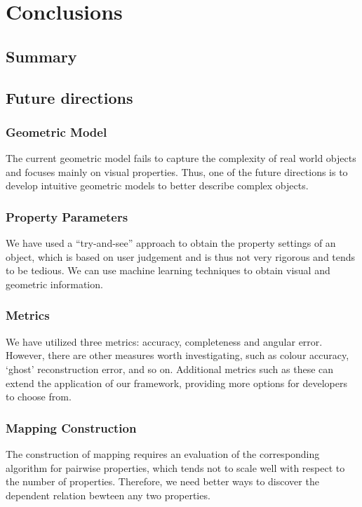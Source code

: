 
\chapter{Conclusions}
\label{sec:conclusion}

\section{Summary}

\section{Future directions}

\subsection{Geometric Model}
The current geometric model fails to capture the complexity of real world objects and focuses mainly on visual properties. Thus, one of the future directions is to develop intuitive geometric models to better describe complex objects.

\subsection{Property Parameters}
We have used a ``try-and-see'' approach to obtain the property settings of an object, which is based on user judgement and is thus not very rigorous and tends to be tedious. We can use machine learning techniques to obtain visual and geometric information.

\subsection{Metrics}
We have utilized three metrics: accuracy, completeness and angular error. However, there are other measures worth investigating, such as colour accuracy, `ghost' reconstruction error, and so on. Additional metrics such as these can extend the application of our framework, providing more options for developers to choose from.

\subsection{Mapping Construction}
The construction of mapping requires an evaluation of the corresponding algorithm for pairwise properties, which tends not to scale well with respect to the number of properties. Therefore, we need better ways to discover the dependent relation bewteen any two properties.

